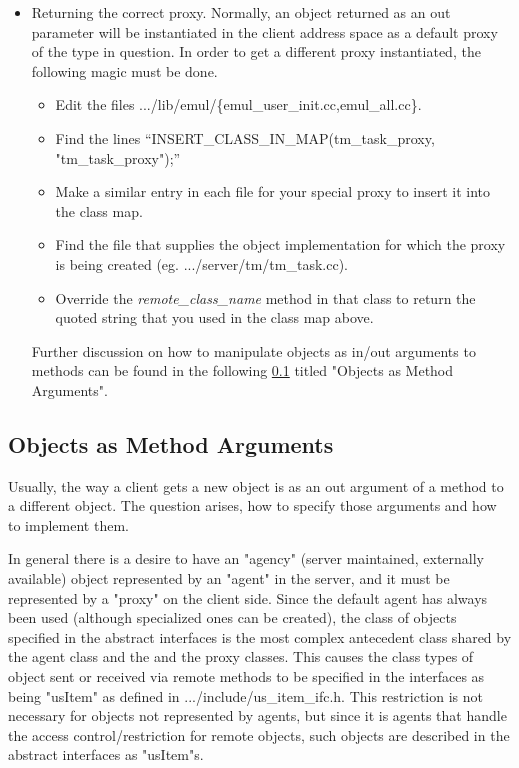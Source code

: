 \begin{itemize}
\begin{itemize}
\item Returning the correct proxy.  Normally, an object returned as an out
parameter will be instantiated in the client address space as a default
proxy of the type in question.  In order to get a different proxy
instantiated, the following magic must be done.
\begin{itemize}
\item Edit the files .../lib/emul/\{emul\_user\_init.cc,emul\_all.cc\}.
\item Find the lines ``INSERT\_CLASS\_IN\_MAP(tm\_task\_proxy, "tm\_task\_proxy");''
\item Make a similar entry in each file for your special proxy to insert it
into the class map.
\item Find the file that supplies the object implementation for which the
proxy is being created (eg. .../server/tm/tm\_task.cc).
\item Override the {\em remote\_class\_name} method in that class to return
the quoted string that you used in the class map above.
\end{itemize}
Further discussion
on how to manipulate objects as in/out arguments to methods can be found 
in the following {\SECREF} \ref{sec:obj-args} titled
"Objects as Method Arguments".

\end{itemize}
\end{itemize}

\subsection{Objects as Method Arguments}
\label{sec:obj-args}
Usually, the way a client gets a new object is as an out argument of a method
to a different object. The question arises, how to specify those arguments
and how to implement them.

In general there is a desire to have an "agency" (server maintained, externally
available) object represented by
an "agent" in the server, and it must be represented by a "proxy" on the
client side.  Since the default agent has always been used (although specialized
ones can be created), the class of objects specified in the abstract
interfaces is the most complex antecedent class shared by the agent class and
the and the proxy classes.  This causes the class types of object sent or
received via remote methods to be specified in the interfaces as being
"usItem" as defined in .../include/us\_item\_ifc.h.  This restriction is
not necessary for objects not represented by agents, but since it is agents
that handle the access control/restriction for remote objects,  such objects
are described in the abstract interfaces as "usItem"s.

